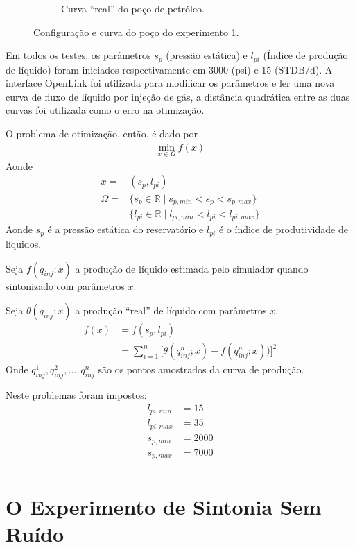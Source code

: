 \begin{figure}[H]
\begin{subfigure}{.75\textwidth}
  \caption{Curva ``real'' do poço de petróleo.}
  \label{fig:truth1}
\end{subfigure}
\caption{Configuração e curva do poço do experimento 1.}
\label{fig:setup1}
\end{figure}

Em todos os testes, os parâmetros $s_p$ (pressão estática) e $l_{pi}$ (Índice de produção de líquido) foram iniciados respectivamente em 3000 (psi) e 15 (STDB/d). A interface OpenLink foi utilizada para modificar os parâmetros e ler uma nova curva de fluxo de líquido por injeção de gás, a distância quadrática entre as duas curvas foi utilizada como o erro na otimização.

O problema de otimização, então, é dado por 
\begin{align}
\min\limits_{x \in \Omega} f(x)
\end{align}
Aonde
\begin{align}
x = &(s_p, l_{pi})\\
\Omega = &\{s_p \in \mathbb{R} \mid s_{p,min} < s_p < s_{p,max}\}\\
          &\{l_{pi} \in \mathbb{R} \mid  l_{pi,min} < l_{pi} < l_{pi,max}\}
\end{align}
Aonde $s_p$ é a pressão estática do reservatório e $l_{pi}$ é o índice de produtividade de líquidos.

Seja $f(q_{inj};x)$ a produção de líquido estimada pelo simulador quando sintonizado com parâmetros $x$. 

Seja $\theta(q_{inj};x)$ a produção ``real'' de líquido com parâmetros $x$.
\begin{align}
f(x) &= f(s_p, l_{pi}) \\
     &= \sum_{i=1}^n \Big[ \theta(q_{inj}^n;x) - f(q_{inj}^n;x))\Big]^2
\end{align}
Onde $q_{inj}^1, q_{inj}^2, \dots, q_{inj}^n$ são os pontos amostrados da curva de produção. 

Neste problemas foram impostos: 
\begin{align*}
l_{pi,min}&= 15\\
l_{pi,max}&= 35\\
s_{p,min} &= 2000\\
s_{p,max} &= 7000\\
\end{align*}
\chapter{O Experimento de Sintonia Sem Ruído}

